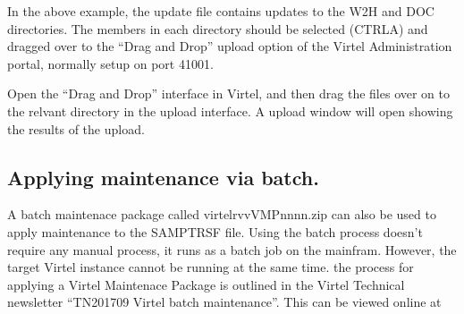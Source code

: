 \documentclass[letterpaper,10pt,english]{sphinxmanual}
\begin{document}
\sphinxAtStartPar
{}

\sphinxAtStartPar
{}

\sphinxAtStartPar
In the above example, the update file contains updates to the W2H and DOC directories. The members in each directory should be selected (CTRL\sphinxhyphen{}A) and dragged over to the “Drag and Drop” upload option of the Virtel Administration portal, normally setup on port 41001.

\sphinxAtStartPar
{}

\sphinxAtStartPar
{}

\sphinxAtStartPar
Open the “Drag and Drop” interface in Virtel, and then drag the files over on to the relvant directory in the upload interface. A upload window will open showing the results of the upload.

\sphinxAtStartPar
{}

\sphinxAtStartPar
{}

\ignorespaces 

\subsection{Applying maintenance via batch.}
\label{\detokenize{audit_operations_ and_performance:applying-maintenance-via-batch}}\label{\detokenize{audit_operations_ and_performance:index-47}}
\sphinxAtStartPar
A batch maintenace package called virtelrvvVMPnnnn.zip can also be used to apply maintenance to the SAMPTRSF file. Using the batch process doesn’t require any manual process, it runs as a batch job on the mainfram. However, the target Virtel instance cannot be running at the same time. the process for applying a Virtel Maintenace Package is outlined in the Virtel Technical newsletter “TN201709 Virtel batch maintenance”. This can be viewed online at 

\newpage
{}\label{\detokenize{audit_operations_ and_performance:v462ap-correspondent-management}}
\ignorespaces 
\end{document}
